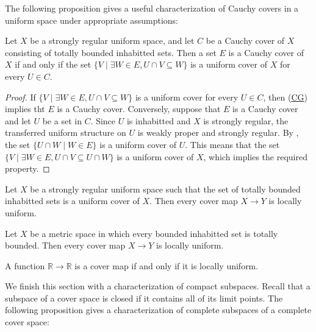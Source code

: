 \documentclass[reqno]{amsart}
\newcommand{\axref}[1]{(\hyperref[ax:#1]{#1})}
\theoremstyle{definition}
\theoremstyle{remark}
\numberwithin{figure}{section}
\begin{document}
The following proposition gives a useful characterization of Cauchy covers in a uniform space under appropriate assumptions:

\begin{prop}
Let $X$ be a strongly regular uniform space, and let $C$ be a Cauchy cover of $X$ consisting of totally bounded inhabitted sets.
Then a set $E$ is a Cauchy cover of $X$ if and only if the set $\{ V \mid \exists W \in E, U \cap V \subseteq W \}$ is a uniform cover of $X$ for every $U \in C$.
\end{prop}
\begin{proof}
If $\{ V \mid \exists W \in E, U \cap V \subseteq W \}$ is a uniform cover for every $U \in C$, then \axref{CG} implies tht $E$ is a Cauchy cover.
Conversely, suppose that $E$ is a Cauchy cover and let $U$ be a set in $C$.
Since $U$ is inhabitted and $X$ is strongly regular, the transferred uniform structure on $U$ is weakly proper and strongly regular.
By , the set $\{ U \cap W \mid W \in E \}$ is a uniform cover of $U$.
This means that the set $\{ V \mid \exists W \in E, U \cap V \subseteq U \cap W \}$ is a uniform cover of $X$, which implies the required property.
\end{proof}

\begin{cor}
Let $X$ be a strongly regular uniform space such that the set of totally bounded inhabitted sets is a uniform cover of $X$.
Then every cover map $X \to Y$ is locally uniform.
\end{cor}

\begin{cor}
Let $X$ be a metric space in which every bounded inhabitted set is totally bounded.
Then every cover map $X \to Y$ is locally uniform.
\end{cor}

\begin{cor}
A function $\mathbb{R} \to \mathbb{R}$ is a cover map if and only if it is locally uniform.
\end{cor}

We finish this section with a characterization of compact subspaces.
Recall that a subspace of a cover space is closed if it contains all of its limit points.
The following proposition gives a characterization of complete subspaces of a complete cover space:
\end{document}
